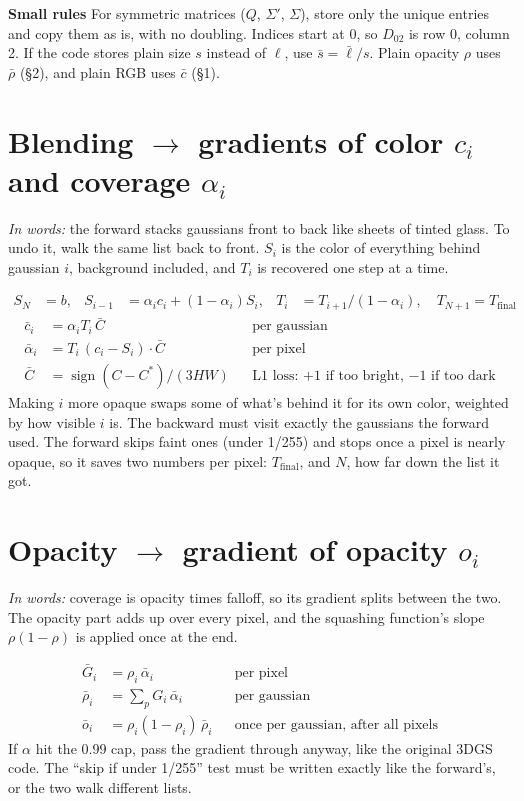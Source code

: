 \documentclass[11pt]{article}
\newcommand{\sgn}{\operatorname{sign}}
\newcommand{\lbl}[1]{\textbf{#1}\quad}
\newcommand{\words}[1]{\textit{In words:} #1\par}
\begin{document}
\lbl{Small rules} For symmetric matrices ($Q$, $\Sigma'$, $\Sigma$), store only the unique entries and copy them as is, with no doubling. Indices start at 0, so $D_{02}$ is row 0, column 2. If the code stores plain size $s$ instead of $\ell$, use $\bar s = \bar\ell / s$. Plain opacity $\rho$ uses $\bar\rho$ (\S2), and plain RGB uses $\bar c$ (\S1).

\section{Blending \texorpdfstring{$\to$}{->} gradients of color $c_i$ and coverage $\alpha_i$}

\words{the forward stacks gaussians front to back like sheets of tinted glass. To undo it, walk the same list back to front. $S_i$ is the color of everything behind gaussian $i$, background included, and $T_i$ is recovered one step at a time.}
\begin{align*}
S_N &= b, & S_{i-1} &= \alpha_i c_i + (1-\alpha_i) S_i, & T_i &= T_{i+1}/(1-\alpha_i),\quad T_{N+1} = T_{\text{final}}
\end{align*}
\begin{align*}
\bar c_i &= \alpha_i T_i\, \bar C && \text{per gaussian} \\
\bar\alpha_i &= T_i\, (c_i - S_i)\cdot \bar C && \text{per pixel} \\
\bar C &= \sgn(C - C^*)/(3HW) && \text{L1 loss: $+1$ if too bright, $-1$ if too dark}
\end{align*}
Making $i$ more opaque swaps some of what's behind it for its own color, weighted by how visible $i$ is. The backward must visit exactly the gaussians the forward used. The forward skips faint ones (under 1/255) and stops once a pixel is nearly opaque, so it saves two numbers per pixel: $T_{\text{final}}$, and $N$, how far down the list it got.

\section{Opacity \texorpdfstring{$\to$}{->} gradient of opacity $o_i$}

\words{coverage is opacity times falloff, so its gradient splits between the two. The opacity part adds up over every pixel, and the squashing function's slope $\rho(1-\rho)$ is applied once at the end.}
\begin{align*}
\bar G_i &= \rho_i\, \bar\alpha_i && \text{per pixel} \\
\bar\rho_i &= \textstyle\sum_p G_i\, \bar\alpha_i && \text{per gaussian} \\
\bar o_i &= \rho_i (1-\rho_i)\, \bar\rho_i && \text{once per gaussian, after all pixels}
\end{align*}
If $\alpha$ hit the 0.99 cap, pass the gradient through anyway, like the original 3DGS code. The ``skip if under 1/255'' test must be written exactly like the forward's, or the two walk different lists.
\end{document}
